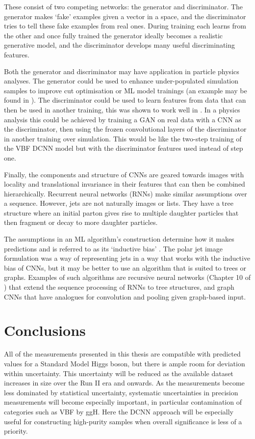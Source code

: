 These consist of two competing networks: the generator and discriminator. 
The generator makes `fake' examples given a vector in a space, and the discriminator tries to tell these fake examples from real ones. 
During training each learns from the other and once fully trained the generator ideally becomes a realistic generative model, and the discriminator develops many useful discriminating features.

Both the generator and discriminator may have application in particle physics analyses. The generator could be used to enhance under-populated simulation samples to improve cut optimisation or ML model trainings (an example may be found in \cite{GANChest}).
The discriminator could be used to learn features from data that can then be used in another training, this was shown to work well in \cite{DCGAN}. 
In a physics analysis this could be achieved by training a GAN on real data with a CNN as the discriminator, then using the frozen convolutional layers of the discriminator in another training over simulation. 
This would be like the two-step training of the VBF DCNN model but with the discriminator features used instead of step one.


Finally, the components and structure of CNNs are geared towards images with locality and translational invariance in their features that can then be combined hierarchically. 
Recurrent neural networks (RNNs) make similar assumptions over a sequence. 
However, jets are not naturally images or lists. They have a tree structure where an initial parton gives rise to multiple daughter particles that then fragment or decay to more daughter particles.

The assumptions in an ML algorithm's construction determine how it makes predictions and is referred to as its `inductive bias' \cite{InductiveBias}.
The polar jet image formulation was a way of representing jets in a way that works with the inductive bias of CNNs, but it may be better to use an algorithm that is suited to trees or graphs.
Examples of such algorithms are recursive neural networks (Chapter 10 of \cite{DeepLearningBook}) that extend the sequence processing of RNNs to tree structures, and graph CNNs \cite{GraphCNNs} that have analogues for convolution and pooling given graph-based input.


\section{Conclusions}
All of the measurements presented in this thesis are compatible with predicted values for a Standard Model Higgs boson, but there is ample room for deviation within uncertainty.
This uncertainty will be reduced as the available dataset increases in size over the Run II era and onwards. 
As the measurements become less dominated by statistical uncertainty, systematic uncertainties in precision measurements will become especially important, in particular contamination of categories such as VBF by ggH. 
Here the DCNN approach will be especially useful for constructing high-purity samples when overall significance is less of a priority.

